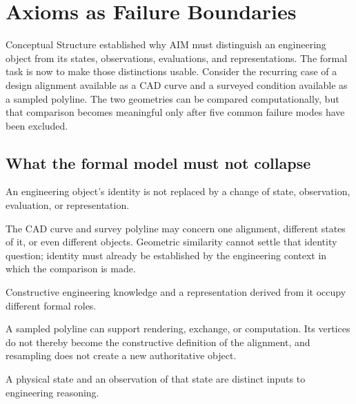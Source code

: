 
\chapter{Axioms as Failure Boundaries}
\label{chap:axiomatic-foundation}

Conceptual Structure established why AIM must distinguish an engineering
object from its states, observations, evaluations, and representations.
The formal task is now to make those distinctions usable. Consider the
recurring case of a design alignment available as a CAD curve and a
surveyed condition available as a sampled polyline. The two geometries
can be compared computationally, but that comparison becomes meaningful
only after five common failure modes have been excluded.

\section{What the formal model must not collapse}

\begin{axiom}
\label{ax:object-continuity}
An engineering object's identity is not replaced by a change of state,
observation, evaluation, or representation.
\end{axiom}

The CAD curve and survey polyline may concern one alignment, different
states of it, or even different objects. Geometric similarity cannot
settle that identity question; identity must already be established by
the engineering context in which the comparison is made.

\begin{axiom}
\label{ax:construction-representation-separation}
Constructive engineering knowledge and a representation derived from it
occupy different formal roles.
\end{axiom}

A sampled polyline can support rendering, exchange, or computation. Its
vertices do not thereby become the constructive definition of the
alignment, and resampling does not create a new authoritative object.

\begin{axiom}
\label{ax:reality-observation-separation}
A physical state and an observation of that state are distinct inputs to
engineering reasoning.
\end{axiom}

